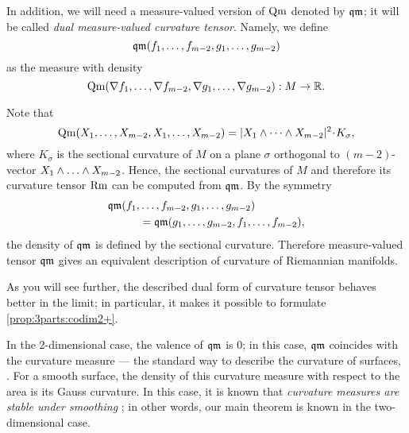In addition, we will need a measure-valued version of $\operatorname{\rm Qm}$ denoted by $\operatorname{\mathfrak{qm}}$;
it will be called \emph{dual measure-valued curvature tensor}.
Namely, we define 
\[\qm(f_1,\zz\dots,f_{m-2},g_1,\zz\dots,g_{m-2})\]
as the measure with density
\[\operatorname{\rm Qm}(\nabla f_1,\dots,\nabla f_{m-2},\nabla g_1,\dots,\nabla g_{m-2}): M\to\mathbb{R}.\]

Note that 
$$\Qm(X_1,\dots,X_{m-2},X_1,\dots,X_{m-2})
=
|X_1\wedge\dots \wedge X_{m-2}|^2\cdot K_\sigma, $$
where $K_\sigma$ is the sectional curvature of $M$ 
on a plane $\sigma$ orthogonal to $(m-2)$-vector
$X_1\wedge\zz\dots \wedge X_{m-2}$.
Hence, the sectional curvatures of $M$ and therefore its curvature tensor $\operatorname{\rm Rm}$ can  be computed from
$\operatorname{\mathfrak{qm}}$.
By the symmetry
\begin{align*}
\operatorname{\mathfrak{qm}}(f_1,&\dots,f_{m-2},g_1,\dots,g_{m-2})
\\
&=
\operatorname{\mathfrak{qm}}(g_1,\dots,g_{m-2},f_1,\dots,f_{m-2}),
\end{align*}
the density of $\operatorname{\mathfrak{qm}}$ is defined by the sectional curvature.
Therefore measure-valued tensor $\operatorname{\mathfrak{qm}}$
gives an equivalent description of curvature of Riemannian manifolds.

As you will see further, the described dual form of curvature tensor behaves better in the limit;
in particular, it makes it possible to formulate \ref{prop:3parts:codim2+}.

In the 2-dimensional case, the valence of $\operatorname{\mathfrak{qm}}$ is $0$;
in this case, $\operatorname{\mathfrak{qm}}$ coincides with the curvature measure --- the standard way to describe the curvature of surfaces, 
\cite{Resh,AZ}.
For a smooth surface, the density of this curvature measure with respect to the area
is its Gauss curvature.
In this case, it is known that \textit{curvature measures are stable under smoothing} \cite[VII \S13]{AZ};
in other words, our main theorem is known in the two-dimensional case.
